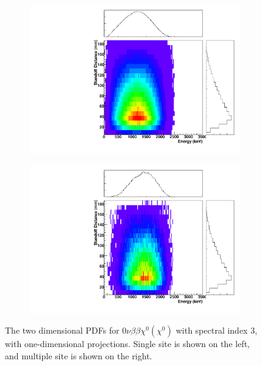\documentclass[herrin-thesis.tex]{subfiles}
\begin{document}
\begin{figure}[hp]
\centering
	\begin{subfigure}[b]{0.48\textwidth}
	\centering
	\includegraphics[width=\textwidth]{./plots/PDFs/analysis_pdf_bb0nX3_ss.pdf}
\end{subfigure}\hfill%
\begin{subfigure}[b]{0.48\textwidth}
	\centering
	\includegraphics[width=1\textwidth]{./plots/PDFs/analysis_pdf_bb0nX3_ms.pdf}
	\end{subfigure}
\caption[PDF for  \(0\nu\beta\beta\chi^{0}(\chi^{0})\)]{The two dimensional PDFs for \(0\nu\beta\beta\chi^{0}(\chi^{0})\) with spectral index 3, with one-dimensional projections. Single site is shown on the left, and multiple site is shown on the right.}
\label{fig:analysis_pdf_bb0nX3}
\end{figure}
\end{document}
